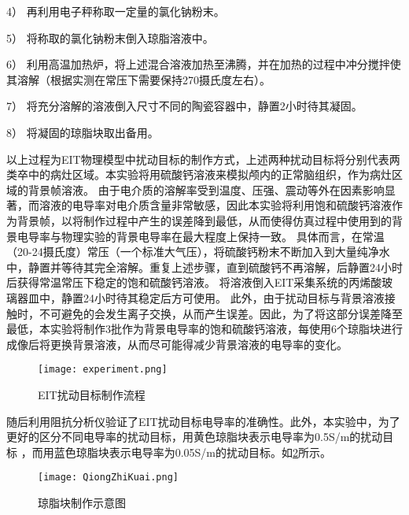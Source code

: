 4） 再利用电子秤称取一定量的氯化钠粉末。

5） 将称取的氯化钠粉末倒入琼脂溶液中。

6） 利用高温加热炉，将上述混合溶液加热至沸腾，并在加热的过程中冲分搅拌使其溶解（根据实测在常压下需要保持270摄氏度左右）。

7） 将充分溶解的溶液倒入尺寸不同的陶瓷容器中，静置2小时待其凝固。

8） 将凝固的琼脂块取出备用。

以上过程为EIT物理模型中扰动目标的制作方式，上述两种扰动目标将分别代表两类卒中的病灶区域。本实验将用硫酸钙溶液来模拟颅内的正常脑组织，作为病灶区域的背景帧溶液。
由于电介质的溶解率受到温度、压强、震动等外在因素影响显著，而溶液的电导率对电介质含量非常敏感，因此本实验将利用饱和硫酸钙溶液作为背景帧，以将制作过程中产生的误差降到最低，从而使得仿真过程中使用到的背景电导率与物理实验的背景电导率在最大程度上保持一致。
具体而言，在常温（20-24摄氏度）常压（一个标准大气压），将硫酸钙粉末不断加入到大量纯净水中，静置并等待其完全溶解。重复上述步骤，直到硫酸钙不再溶解，后静置24小时后获得常温常压下稳定的饱和硫酸钙溶液。
将溶液倒入EIT采集系统的丙烯酸玻璃器皿中，静置24小时待其稳定后方可使用。
此外，由于扰动目标与背景溶液接触时，不可避免的会发生离子交换，从而产生误差。因此，为了将这部分误差降至最低，本实验将制作3批作为背景电导率的饱和硫酸钙溶液，每使用6个琼脂块进行成像后将更换背景溶液，从而尽可能得减少背景溶液的电导率的变化。






\begin{figure}[H]
    \centering
    \texttt{[image: experiment.png]}
    \caption{EIT扰动目标制作流程}
    \label{figure:experiment}
\end{figure}

随后利用阻抗分析仪验证了EIT扰动目标电导率的准确性。此外，本实验中，为了更好的区分不同电导率的扰动目标，用黄色琼脂块表示电导率为0.5S/m的扰动目标
，而用蓝色琼脂块表示电导率为0.05S/m的扰动目标。如\cref{figure:QiongZhiKuai}所示。


\begin{figure}[h]
    \centering

    \texttt{[image: QiongZhiKuai.png]}
    \caption{琼脂块制作示意图}
    \label{figure:QiongZhiKuai}
\end{figure}





